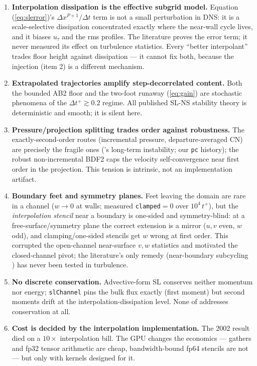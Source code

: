 \documentclass[11pt,a4paper]{article}
\newcommand{\ut}{u_\tau}
\newcommand{\dtp}{\Delta t^{+}}
\begin{document}
\begin{enumerate}
\item \textbf{Interpolation dissipation is the effective subgrid model.}
Equation (\ref{eq:slerror})'s $\Delta x^{P+1}/\Delta t$ term is not a small
perturbation in DNS: it is a scale-selective dissipation concentrated exactly
where the near-wall cycle lives, and it biases $\ut$ and the rms profiles.
The literature proves the error term; it never measured its effect on
turbulence statistics. Every ``better interpolant'' trades floor height
against dissipation --- it cannot fix both, because the injection (item 2) is
a different mechanism.
\item \textbf{Extrapolated trajectories amplify step-decorrelated content.}
Both the bounded AB2 floor and the two-foot runaway (\ref{eq:gain}) are
stochastic phenomena of the $\dtp\gtrsim0.2$ regime. All published SL-NS
stability theory is deterministic and smooth; it is silent here.
\item \textbf{Pressure/projection splitting trades order against
robustness.} The exactly-second-order routes (incremental pressure,
departure-averaged CN) are precisely the fragile ones
(\cite{xiu01}'s long-term instability; our \texttt{pc} history); the robust
non-incremental BDF2 caps the velocity self-convergence near first order in
the projection. This tension is intrinsic, not an implementation artifact.
\item \textbf{Boundary feet and symmetry planes.} Feet leaving the domain
are rare in a channel ($w\to0$ at walls; measured \texttt{clamped}${}=0$
over $10^4\,t^{+}$), but the \emph{interpolation stencil} near a boundary is
one-sided and symmetry-blind: at a free-surface/symmetry plane the correct
extension is a mirror ($u,v$ even, $w$ odd), and clamping/one-sided stencils
get $w$ wrong at first order. This corrupted the open-channel near-surface
$v,w$ statistics and motivated the closed-channel pivot; the literature's
only remedy (near-boundary subcycling \cite{xiu05,falcone98}) has never been
tested in turbulence.
\item \textbf{No discrete conservation.} Advective-form SL conserves neither
momentum nor energy; \texttt{slChannel} pins the bulk flux exactly (first
moment) but second moments drift at the interpolation-dissipation level.
None of \cite{boukir97,xiu01,xu02,xiu05} addresses conservation at all.
\item \textbf{Cost is decided by the interpolation implementation.} The
2002 result died on a $10\times$ interpolation bill. The GPU changes the
economics --- gathers and fp32 tensor arithmetic are cheap, bandwidth-bound
fp64 stencils are not --- but only with kernels designed for it.
\end{enumerate}
\end{document}
